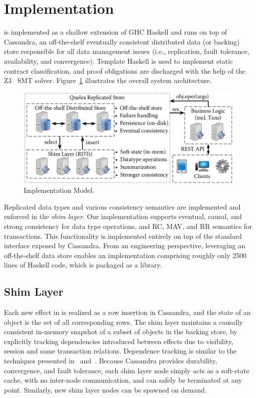 \section{Implementation}
\label{sec:impl}

\name is implemented as a shallow extension of GHC Haskell and runs on top of
Cassandra, an off-the-shelf eventually consistent distributed data (or backing)
store responsible for all data management issues (i.e., replication, fault
tolerance, availability, and convergence).  Template Haskell is used to
implement static contract classification, and proof obligations are discharged
with the help of the Z3~\cite{Z3} SMT solver. Figure~\ref{fig:impl_mod}
illustrates the overall system architecture.

\begin{figure}
\begin{center}
\includegraphics[width=\columnwidth]{Figures/ImplModel}
\end{center}
\caption{Implementation Model.}
\label{fig:impl_mod}
\end{figure}

Replicated data types and various consistency semantics are implemented and
enforced in the \emph{shim layer}. Our implementation supports eventual,
causal, and strong consistency for data type operations, and RC, MAV, and RR
semantics for transactions.  This functionality is implemented entirely on
top of the standard interface exposed by Cassandra. From an engineering
perspective, leveraging an off-the-shelf data store enables an
implementation comprising roughly only 2500 lines of Haskell code, which is
packaged as a library.

\subsection{Shim Layer}

Each new effect in \name is realized as a row insertion in Cassandra, and
the state of an object is the set of all corresponding rows. The shim layer
maintains a causally consistent in-memory snapshot of a subset of objects in
the backing store, by explicitly tracking dependencies introduced between
effects due to visibility, session and same transaction
relations. Dependence tracking is similar to the techniques presented
in~\cite{BoltOn} and~\cite{Eiger}. Because Cassandra provides durability,
convergence, and fault tolerance, each shim layer node simply acts as a
soft-state cache, with no inter-node communication, and can safely be
terminated at any point. Similarly, new shim layer nodes can be spawned on
demand.


